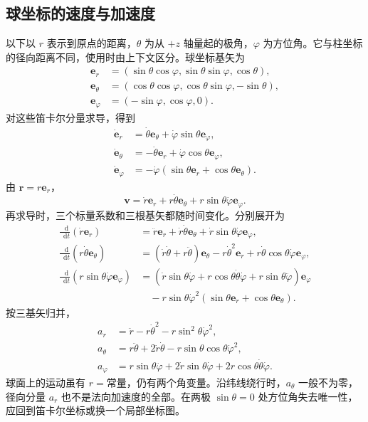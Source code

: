 \documentclass[11pt,openany,fontset=fandol]{ctexbook}
\theoremstyle{definition}\newtheorem{example}{例}[chapter]\newtheorem{exercise}{习题}[chapter]
\newcommand{\dd}{\mathop{}\!\mathrm d}\newcommand{\ee}{\mathrm e}\newcommand{\vct}[1]{\bm{#1}}
\begin{document}
\subsection{球坐标的速度与加速度}
以下以 $r$ 表示到原点的距离，$\theta$ 为从 $+z$ 轴量起的极角，$\varphi$ 为方位角。它与柱坐标的径向距离不同，使用时由上下文区分。球坐标基矢为
\begin{align*}
\vct e_r&=(\sin\theta\cos\varphi,\sin\theta\sin\varphi,\cos\theta),\\
\vct e_\theta&=(\cos\theta\cos\varphi,\cos\theta\sin\varphi,-\sin\theta),\\
\vct e_\varphi&=(-\sin\varphi,\cos\varphi,0).
\end{align*}
对这些笛卡尔分量求导，得到
\begin{align*}
\dot{\vct e}_r&=\dot\theta\vct e_\theta+\dot\varphi\sin\theta\vct e_\varphi,\\
\dot{\vct e}_\theta&=-\dot\theta\vct e_r+\dot\varphi\cos\theta\vct e_\varphi,\\
\dot{\vct e}_\varphi&=-\dot\varphi(\sin\theta\vct e_r+\cos\theta\vct e_\theta).
\end{align*}
由 $\vct r=r\vct e_r$，
\[
\vct v=\dot r\vct e_r+r\dot\theta\vct e_\theta
+r\sin\theta\dot\varphi\vct e_\varphi.
\]
再求导时，三个标量系数和三根基矢都随时间变化。分别展开为
\[
\begin{aligned}
\frac{\dd}{\dd t}(\dot r\vct e_r)
&=\ddot r\vct e_r+\dot r\dot\theta\vct e_\theta
+\dot r\sin\theta\dot\varphi\vct e_\varphi,\\
\frac{\dd}{\dd t}(r\dot\theta\vct e_\theta)
&=(\dot r\dot\theta+r\ddot\theta)\vct e_\theta
-r\dot\theta^2\vct e_r
+r\dot\theta\cos\theta\dot\varphi\vct e_\varphi,\\
\frac{\dd}{\dd t}(r\sin\theta\dot\varphi\vct e_\varphi)
&=(\dot r\sin\theta\dot\varphi+r\cos\theta\dot\theta\dot\varphi
+r\sin\theta\ddot\varphi)\vct e_\varphi\\
&\quad-r\sin\theta\dot\varphi^2
(\sin\theta\vct e_r+\cos\theta\vct e_\theta).
\end{aligned}
\]
按三基矢归并，
\begin{align}
a_r&=\ddot r-r\dot\theta^2-r\sin^2\theta\dot\varphi^2,\nonumber\\
a_\theta&=r\ddot\theta+2\dot r\dot\theta
-r\sin\theta\cos\theta\dot\varphi^2,\label{mp3:eq:l3-spherical-a}\\
a_\varphi&=r\sin\theta\ddot\varphi
+2\dot r\sin\theta\dot\varphi
+2r\cos\theta\dot\theta\dot\varphi.\nonumber
\end{align}
球面上的运动虽有 $r=\text{常量}$，仍有两个角变量。沿纬线绕行时，$a_\theta$ 一般不为零，径向分量 $a_r$ 也不是法向加速度的全部。在两极 $\sin\theta=0$ 处方位角失去唯一性，应回到笛卡尔坐标或换一个局部坐标图。
\end{document}
